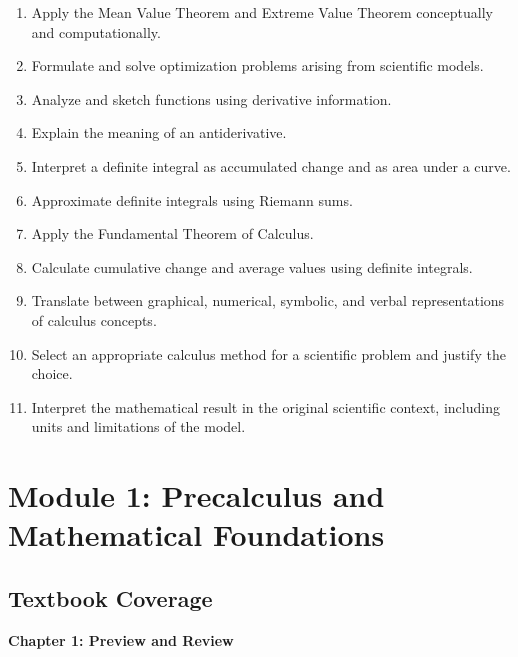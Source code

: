 \documentclass[11pt]{article}
\begin{document}
\begin{enumerate}[label=\textbf{LO\arabic*.}]
    \item Apply the Mean Value Theorem and Extreme Value Theorem conceptually
          and computationally.
          
    \item Formulate and solve optimization problems arising from scientific
          models.
          
    \item Analyze and sketch functions using derivative information.
    
    \item Explain the meaning of an antiderivative.
    
    \item Interpret a definite integral as accumulated change and as area
          under a curve.
          
    \item Approximate definite integrals using Riemann sums.
    
    \item Apply the Fundamental Theorem of Calculus.
    
    \item Calculate cumulative change and average values using definite
          integrals.
          
    \item Translate between graphical, numerical, symbolic, and verbal
          representations of calculus concepts.
          
    \item Select an appropriate calculus method for a scientific problem and
          justify the choice.
          
    \item Interpret the mathematical result in the original scientific
          context, including units and limitations of the model.
\end{enumerate}

\section{Module 1: Precalculus and Mathematical Foundations}

\subsection{Textbook Coverage}

\textbf{Chapter 1: Preview and Review}
\end{document}
